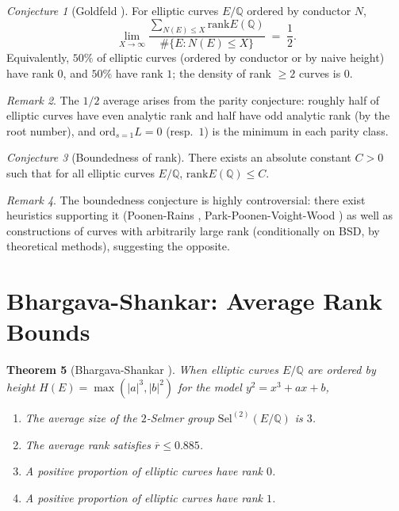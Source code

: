 \documentclass[12pt,a4paper]{amsart}
\newtheorem{theorem}{Theorem}[section]
\theoremstyle{definition}
\theoremstyle{remark}
\newtheorem{remark}[theorem]{Remark}
\newtheorem{conjecture}[theorem]{Conjecture}
\newcommand{\Q}{\mathbb{Q}}
\newcommand{\Sel}{\mathrm{Sel}}
\newcommand{\rank}{\mathrm{rank}}
\newcommand{\ord}{\mathrm{ord}}
\begin{document}
\begin{conjecture}[Goldfeld \cite{Goldfeld1979}]\label{conj:goldfeld}
  For elliptic curves $E/\Q$ ordered by conductor $N$,
  \[
    \lim_{X\to\infty} \frac{\sum_{N(E) \leq X} \rank E(\Q)}
                           {\#\{E : N(E) \leq X\}}
    \;=\; \frac{1}{2}.
  \]
  Equivalently, $50\%$ of elliptic curves (ordered by conductor or by naive height)
  have rank $0$, and $50\%$ have rank $1$; the density of rank $\geq 2$ curves is $0$.
\end{conjecture}

\begin{remark}
  The $1/2$ average arises from the parity conjecture: roughly half of elliptic curves
  have even analytic rank and half have odd analytic rank (by the root number), and
  $\ord_{s=1} L = 0$ (resp.\ $1$) is the minimum in each parity class.
\end{remark}

\begin{conjecture}[Boundedness of rank]\label{conj:bounded}
  There exists an absolute constant $C > 0$ such that for all elliptic curves $E/\Q$,
  $\rank E(\Q) \leq C$.
\end{conjecture}

\begin{remark}
  The boundedness conjecture is highly controversial: there exist heuristics supporting
  it (Poonen-Rains \cite{PR2012}, Park-Poonen-Voight-Wood \cite{PPVW2019}) as well as
  constructions of curves with arbitrarily large rank (conditionally on BSD, by
  theoretical methods), suggesting the opposite.
\end{remark}

\section{Bhargava-Shankar: Average Rank Bounds}\label{sec:bhargava}

\begin{theorem}[Bhargava-Shankar \cite{BS2015}]\label{thm:bs}
  When elliptic curves $E/\Q$ are ordered by height
  $H(E) = \max(|a|^3, |b|^2)$ for the model $y^2 = x^3 + ax + b$,
  \begin{enumerate}[label=(\roman*)]
    \item The average size of the $2$-Selmer group $\Sel^{(2)}(E/\Q)$ is $3$.
    \item The average rank satisfies $\overline{r} \leq 0.885$.
    \item A positive proportion of elliptic curves have rank $0$.
    \item A positive proportion of elliptic curves have rank $1$.
  \end{enumerate}
\end{theorem}
\end{document}

